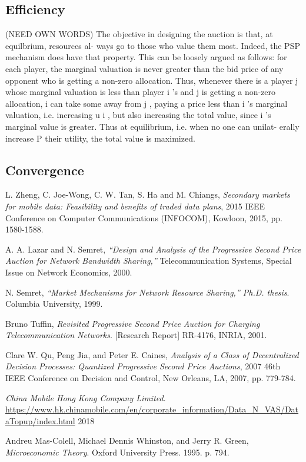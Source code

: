 \documentclass[12pt]{article}
\theoremstyle{definition}
\begin{document}
\begin{multicols}{2}
\subsection{Efficiency}
(NEED OWN WORDS)
The objective in designing the auction is that, at equilbrium, resources al-
ways go to those who value them most. Indeed, the PSP mechanism does
have that property. This can be loosely argued as follows: for each player,
the marginal valuation is never greater than the bid price of any opponent
who is getting a non-zero allocation. Thus, whenever there is a player j
whose marginal valuation is less than player i 's and j is getting a non-zero
allocation, i can take some away from j , paying a price less than i 's marginal
valuation, i.e. increasing u i , but also increasing the total value, since i 's
marginal value is greater. Thus at equilibrium, i.e. when no one can unilat-
erally increase P their utility, the total value is maximized.

\subsection{Convergence}

\end{multicols}

\begin{thebibliography}{9}

L. Zheng, C. Joe-Wong, C. W. Tan, S. Ha and M. Chiangs, 
\textit{Secondary markets for mobile data: Feasibility and benefits of traded
data plans}, 2015 IEEE
Conference on Computer Communications (INFOCOM), Kowloon, 2015, pp. 1580-1588.

A. A. Lazar and N. Semret, 
\textit{“Design and Analysis of the Progressive Second Price Auction for Network
Bandwidth Sharing,”} Telecommunication Systems, Special Issue on Network Economics, 2000.

N. Semret, 
\textit{“Market Mechanisms for Network Resource Sharing,”
Ph.D. thesis}. 
Columbia University, 1999.

Bruno Tuffin,
\textit{Revisited Progressive Second Price Auction for Charging
Telecommunication Networks}.
[Research Report] RR-4176, INRIA, 2001.

Clare W. Qu, Peng Jia, and Peter E. Caines,
\textit{Analysis of a Class of Decentralized Decision Processes: Quantized
Progressive Second Price Auctions},
2007 46th IEEE Conference on Decision and Control, New Orleans, LA, 2007, pp.
779-784.

\textit{China Mobile Hong Kong Company Limited}.
\url{https://www.hk.chinamobile.com/en/corporate_information/Data_N_VAS/DataTopup/index.html} 
2018

Andreu Mas-Colell, Michael Dennis Whinston, and Jerry R. Green, 
\textit{Microeconomic Theory}. Oxford University Press. 1995. p. 794.

\end{thebibliography}
\end{document}
